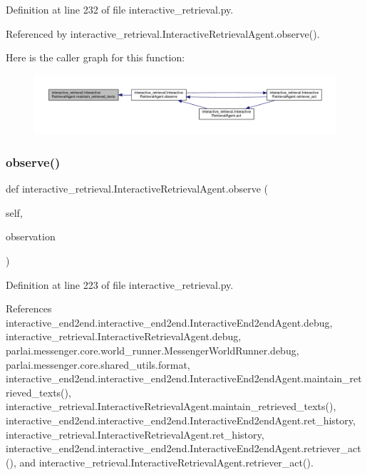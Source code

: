 Definition at line 232 of file interactive\+\_\+retrieval.\+py.



Referenced by interactive\+\_\+retrieval.\+Interactive\+Retrieval\+Agent.\+observe().

Here is the caller graph for this function\+:
\nopagebreak
\begin{figure}[H]
\begin{center}
\leavevmode
\includegraphics[width=350pt]{classinteractive__retrieval_1_1InteractiveRetrievalAgent_ae3894ebf2b1bb0695eba66d9b1a0f13f_icgraph}
\end{center}
\end{figure}
\mbox{\label{classinteractive__retrieval_1_1InteractiveRetrievalAgent_ac8b7ac5b6dbc150f066995b25368d9bd}} 
\subsubsection{\texorpdfstring{observe()}{observe()}}
{\footnotesize\ttfamily def interactive\+\_\+retrieval.\+Interactive\+Retrieval\+Agent.\+observe (\begin{DoxyParamCaption}\item[{}]{self,  }\item[{}]{observation }\end{DoxyParamCaption})}



Definition at line 223 of file interactive\+\_\+retrieval.\+py.



References interactive\+\_\+end2end.\+interactive\+\_\+end2end.\+Interactive\+End2end\+Agent.\+debug, interactive\+\_\+retrieval.\+Interactive\+Retrieval\+Agent.\+debug, parlai.\+messenger.\+core.\+world\+\_\+runner.\+Messenger\+World\+Runner.\+debug, parlai.\+messenger.\+core.\+shared\+\_\+utils.\+format, interactive\+\_\+end2end.\+interactive\+\_\+end2end.\+Interactive\+End2end\+Agent.\+maintain\+\_\+retrieved\+\_\+texts(), interactive\+\_\+retrieval.\+Interactive\+Retrieval\+Agent.\+maintain\+\_\+retrieved\+\_\+texts(), interactive\+\_\+end2end.\+interactive\+\_\+end2end.\+Interactive\+End2end\+Agent.\+ret\+\_\+history, interactive\+\_\+retrieval.\+Interactive\+Retrieval\+Agent.\+ret\+\_\+history, interactive\+\_\+end2end.\+interactive\+\_\+end2end.\+Interactive\+End2end\+Agent.\+retriever\+\_\+act(), and interactive\+\_\+retrieval.\+Interactive\+Retrieval\+Agent.\+retriever\+\_\+act().



